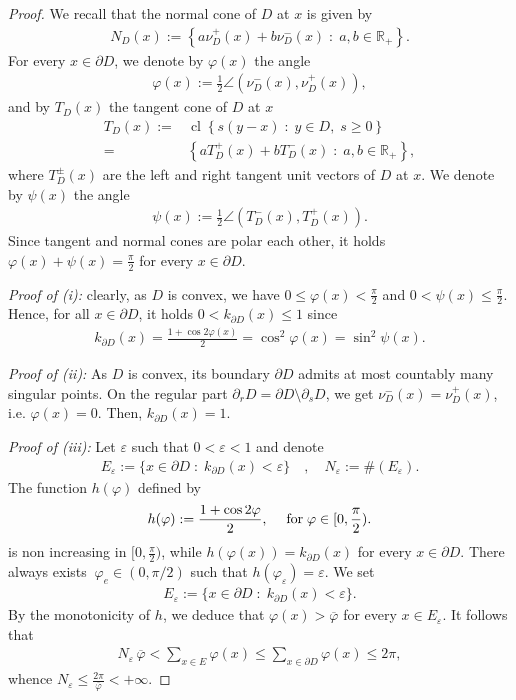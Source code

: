 \documentclass[10pt,a4paper]{amsart}
\DeclareMathOperator{\cl}{cl}
\def\e{\varepsilon}
\def\ov{\overline}
\def\sepa{\; : \;}
\newcommand{\RR}{\mathbb{R}}
\newcommand{\aco}[1]{\left\{#1\right\}}
\newcommand{\tinm}[1]{\text{\;#1\;}}
\begin{document}
\begin{proof}
We recall that the normal cone of $D$ at $x$ is given by
\begin{align*}
N_{D}(x):=\aco{ a \nu_D^+(x) + b \nu_D^-(x) \sepa a,b \in \RR_+ }.
\end{align*}
For every $x\in \partial D$, we denote by $\varphi(x)$ the angle
\begin{align*}
\varphi(x):= \frac{1}{2}\angle(\nu_D^-(x),\nu_D^+(x)),
\end{align*}
and by $T_D(x)$ the tangent cone of $D$ at $x$
\begin{align*}
T_D(x):= & \cl \aco{ s(y-x) \sepa y\in D,\; s\ge 0 }\\
=& \aco{a T_D^+(x) + b T_D^-(x) \sepa a,b \in \RR_+},
\end{align*}
where $T_D^\pm(x)$ are the left and right tangent unit vectors of $D$ at $x$. We denote by $\psi(x)$ the angle 
\begin{align*}
\psi(x):= \frac{1}{2}\angle (T_D^-(x),T_D^+(x)).
\end{align*} 
Since tangent and normal cones are polar each other, it holds $\varphi(x)+\psi(x) = \frac{\pi}{2}$ for every $x\in \partial D$.


\noindent
\emph{Proof of (i):} clearly, as $D$ is convex, we have 
$ 0\le \varphi(x)< \frac{\pi}{2}$ and  $0< \psi(x)\le \frac{\pi}{2}$.
Hence, for all $x\in\partial D$, it holds $0<k_{\partial D}(x) \le 1$ since
\begin{align*}
k_{\partial D}(x)=\frac{1+\cos 2\varphi(x) }{2} =\cos^2\varphi(x) = \sin^2 \psi(x).
\end{align*}

\noindent
\emph{Proof of (ii):}  As $D$ is convex, its boundary $\partial D$ admits at most countably many singular points. On the regular part $\partial_r D=\partial D\setminus \partial_s D$, we get $\nu_D^-(x)=\nu_D^+(x)$, i.e. $\varphi(x)=0$. Then, $k_{\partial D}(x)=1$.

\medskip
\noindent
\emph{Proof of (iii):} Let $\e$ such that $0<\e<1$ and denote
\begin{align*}
E_\e:=\{ x\in\partial D \sepa k_{\partial D}(x) <\e \}\quad,\quad N_\e:=\#(E_\e) .
\end{align*}
  The function $h(\varphi)$ defined by
\begin{align*}
h(\varphi):=\frac{1+\cos 2\varphi}{2}, \quad \tinm{for} \varphi\in [0,\frac{\pi}{2}).
\end{align*}
 is non increasing in $[0,\frac{\pi}{2})$, while  $h(\varphi(x))=k_{\partial D}(x)$ for every $x\in \partial D$.
There always exists $\ \varphi_e\in (0,\pi/2)$ such that $h(\varphi_\e)=\e$. We set
\begin{align*}
E_\e:=\{ x\in\partial D \sepa k_{\partial D}(x) <\e \}.
\end{align*}
By the monotonicity of $h$, we deduce that  $\varphi(x) > \ov \varphi$ for every $x\in E_\e$.
It follows that
\begin{align*}
N_\e\, \ov\varphi  < \sum_{x\in E}\varphi(x) \le \sum_{x\in\partial D}\varphi(x) \le 2\pi ,
\end{align*}
whence $N_\e \le \frac{2\pi}{ \ov\varphi} <+\infty$.
\end{proof}
\end{document}
